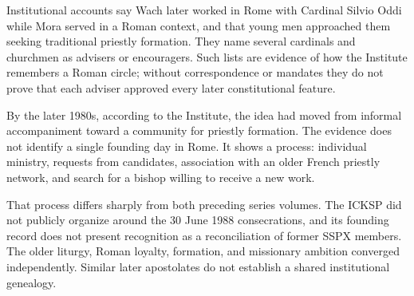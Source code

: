 Institutional accounts say Wach later worked in Rome with Cardinal Silvio Oddi while Mora served in a Roman context, and that young men approached them seeking traditional priestly formation. They name several cardinals and churchmen as advisers or encouragers. Such lists are evidence of how the Institute remembers a Roman circle; without correspondence or mandates they do not prove that each adviser approved every later constitutional feature.

By the later 1980s, according to the Institute, the idea had moved from informal accompaniment toward a community for priestly formation. The evidence does not identify a single founding day in Rome. It shows a process: individual ministry, requests from candidates, association with an older French priestly network, and search for a bishop willing to receive a new work.

That process differs sharply from both preceding series volumes. The ICKSP did not publicly organize around the 30 June 1988 consecrations, and its founding record does not present recognition as a reconciliation of former SSPX members. The older liturgy, Roman loyalty, formation, and missionary ambition converged independently. Similar later apostolates do not establish a shared institutional genealogy.

